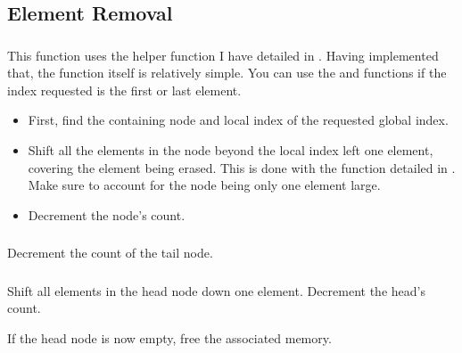 \subsection{Element Removal}


\subsubsection{}

This function uses the  helper function I have detailed in
. Having implemented that, the function itself is relatively simple.
You can use the  and  functions if the index requested is
the first or last element.


\begin{itemize}
	\item First, find the containing node and local index of the requested global
	      index.
	\item Shift all the elements in the node beyond the local index left one element,
	      covering the element being erased. This is done with the 
	      function detailed in . Make sure
	      to account for the node being only one element large.
	\item Decrement the node's count.
\end{itemize}


\subsubsection{}
Decrement the count of the tail node.

\subsubsection{}
Shift all elements in the head node down one element.
Decrement the head's count.

If the head node is now empty, free the associated memory.
